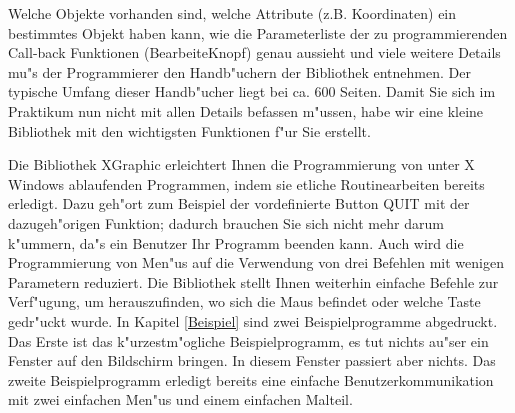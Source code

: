  Welche Objekte vorhanden sind, welche Attribute (z.B. Koordinaten) ein
 bestimmtes Objekt haben kann, wie die Parameterliste der zu
 programmierenden Call-back Funktionen (BearbeiteKnopf) genau aussieht
 und viele weitere Details mu"s der Programmierer den Handb"uchern der
 Bibliothek entnehmen. Der typische Umfang dieser Handb"ucher liegt
 bei ca. 600 Seiten. Damit Sie sich im Praktikum nun nicht mit allen
 Details befassen m"ussen, habe wir eine kleine Bibliothek mit den
 wichtigsten Funktionen f"ur Sie erstellt.
 


%
%
%

Die Bibliothek XGraphic erleichtert Ihnen die Programmierung von
unter X Windows ablaufenden Programmen, indem sie
etliche Routinearbeiten bereits
erledigt. Dazu geh"ort zum Beispiel der vordefinierte Button QUIT mit der
dazugeh"origen Funktion; dadurch brauchen Sie sich nicht mehr darum k"ummern,
da"s ein Benutzer Ihr Programm beenden kann. Auch wird die Programmierung von
Men"us auf die Verwendung von drei Befehlen mit wenigen Parametern
reduziert. Die Bibliothek stellt Ihnen weiterhin einfache Befehle zur
Verf"ugung, um herauszufinden, wo sich die Maus befindet oder welche Taste
gedr"uckt wurde. In Kapitel \ref{Beispiel} sind zwei Beispielprogramme
abgedruckt. Das Erste ist das k"urzestm"ogliche Beispielprogramm, es tut nichts
au"ser ein Fenster auf den Bildschirm bringen. In diesem Fenster passiert
aber nichts. Das zweite Beispielprogramm erledigt bereits eine einfache
Benutzerkommunikation mit zwei einfachen Men"us und einem einfachen Malteil.





